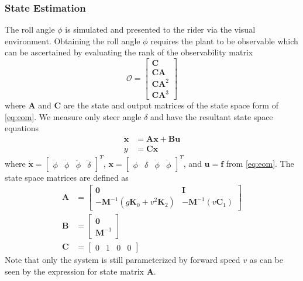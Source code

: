 \documentclass[11pt,a4paper,reqno]{amsart}
\newcommand{\mass}{\bm{M}}
\newcommand{\damping}{v \bm{C}_1}
\newcommand{\stiffness}{g \bm{K}_0 + v^2 \bm{K}_2}
\newcommand{\dstate}{\dot{\bm{x}}}
\newcommand{\state}{\bm{x}}
\newcommand{\sysInput}{\bm{u}}
\newcommand{\sysOutput}{y}
\newcommand{\stateMat}{\bm{A}}
\newcommand{\inputMat}{\bm{B}}
\newcommand{\outputMat}{\bm{C}}
\newcommand{\roll}{\phi}
\newcommand{\steer}{\delta}
\newcommand{\rollRate}{\dot{\phi}}
\newcommand{\steerRate}{\dot{\phi}}
\begin{document}
\subsubsection{State Estimation}
The roll angle $ \roll $ is simulated and presented to the rider via the visual environment.
Obtaining the roll angle $ \roll $ requires the plant to be observable which can be ascertained by evaluating the rank of
the observability matrix
\begin{equation}
    \bm{\mathcal{O}} = \begin{bmatrix} \outputMat \\ \outputMat\stateMat \\
                                       \outputMat\stateMat^2 \\ \outputMat\stateMat^3 \end{bmatrix}
\end{equation}
where $ \bm{A} $ and $ \bm{C} $ are the state and output matrices of the state space form of \autoref{eq:eom}.
We measure only steer angle $ \steer $ and have the resultant state space equations
\begin{equation}
\begin{aligned}
    \dstate &= \stateMat \state + \inputMat \sysInput \\
    \sysOutput &= \outputMat \state \label{eq:ss}
\end{aligned}
\end{equation}
where $ \dot{\bm{x}} = \begin{bmatrix} \rollRate & \steerRate & \ddot{\roll} & \ddot{\steer} \end{bmatrix}^T $,
$ \bm{x} = \begin{bmatrix} \roll & \steer& \rollRate & \steerRate \end{bmatrix}^T $,
and $ \bm{u} = \bm{f} $ from \autoref{eq:eom}.
The state space matrices are defined as
\begin{equation}
\begin{aligned}
    \stateMat &= \begin{bmatrix} \bm{0} & \bm{I} \\
                -\mass^{-1} (\stiffness) & -\mass^{-1} (\damping) \end{bmatrix} \\
    \inputMat &= \begin{bmatrix} \bm{0} \\ \mass^{-1} \end{bmatrix} \\
    \outputMat &= \begin{bmatrix} 0 & 1 & 0 & 0 \end{bmatrix}
\end{aligned}
\end{equation}
Note that only the system is still parameterized by forward speed $ v $  as can be seen by the expression for
state matrix $ \stateMat $.
\end{document}
